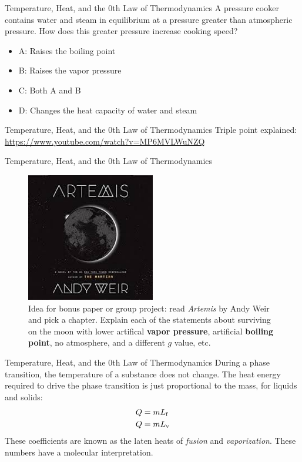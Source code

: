 \documentclass{beamer}
\begin{document}
\begin{frame}{Temperature, Heat, and the 0th Law of Thermodynamics}
A pressure cooker contains water and steam in equilibrium at a pressure greater than atmospheric pressure.  How does this greater pressure increase cooking speed?
\begin{itemize}
\item A: Raises the boiling point
\item B: Raises the vapor pressure
\item C: Both A and B
\item D: Changes the heat capacity of water and steam
\end{itemize}
\end{frame}

\begin{frame}{Temperature, Heat, and the 0th Law of Thermodynamics}
Triple point explained: \\ \url{https://www.youtube.com/watch?v=MP6MVLWuNZQ}
\end{frame}

\begin{frame}{Temperature, Heat, and the 0th Law of Thermodynamics}
\begin{figure}
\centering
\includegraphics[width=0.5\textwidth]{figures/artemis.jpg}
\caption{\label{fig:artemis} Idea for bonus paper or group project: read \textit{Artemis} by Andy Weir and pick a chapter.  Explain each of the statements about surviving on the moon with lower artifical \textbf{vapor pressure}, artificial \textbf{boiling point}, no atmosphere, and a different $g$ value, etc.}
\end{figure}
\end{frame}

\begin{frame}{Temperature, Heat, and the 0th Law of Thermodynamics}
\small
During a phase transition, the temperature of a substance does not change.  The heat energy required to drive the phase transition is just proportional to the mass, for liquids and solids:
\begin{align}
Q &= m L_{\rm f} \\
Q &= m L_{\rm v}
\end{align}
These coefficients are known as the laten heats of \textit{fusion} and \textit{vaporization}.  These numbers have a molecular interpretation.
\end{frame}
\end{document}
